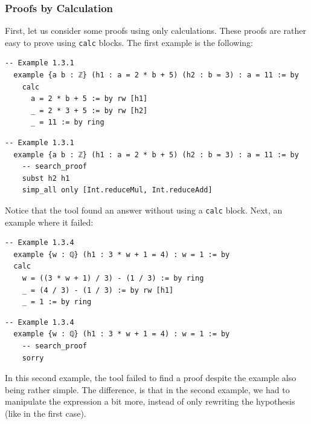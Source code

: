 \documentclass[12pt]{article}
\newcommand{\leancopilot}{\texttt{LeanCopilot} }
\begin{document}
\subsubsection{Proofs by Calculation}
First, let us consider some proofs using only calculations. These proofs are rather easy to prove using \texttt{calc} blocks. The first example is the following:

\begin{minipage}{0.495\textwidth}
  \begin{lstlisting}[title={Human proof}]
  -- Example 1.3.1
  example {a b : ℤ} (h1 : a = 2 * b + 5) (h2 : b = 3) : a = 11 := by
    calc
      a = 2 * b + 5 := by rw [h1]
      _ = 2 * 3 + 5 := by rw [h2]
      _ = 11 := by ring
  \end{lstlisting}
\end{minipage}
\vline
\begin{minipage}{0.495\textwidth}
  \begin{lstlisting}[title={\leancopilot proof}]
  -- Example 1.3.1
  example {a b : ℤ} (h1 : a = 2 * b + 5) (h2 : b = 3) : a = 11 := by
    -- search_proof
    subst h2 h1
    simp_all only [Int.reduceMul, Int.reduceAdd]
  \end{lstlisting}
\end{minipage}

Notice that the tool found an answer without using a \texttt{calc} block. Next, an example where it failed:

\begin{minipage}{0.495\textwidth}
  \begin{lstlisting}[title={Human proof}]
  -- Example 1.3.4
  example {w : ℚ} (h1 : 3 * w + 1 = 4) : w = 1 := by
  calc
    w = ((3 * w + 1) / 3) - (1 / 3) := by ring
    _ = (4 / 3) - (1 / 3) := by rw [h1]
    _ = 1 := by ring
  \end{lstlisting}
\end{minipage}
\vline
\begin{minipage}{0.495\textwidth}
  \begin{lstlisting}[title={\leancopilot proof}]
  -- Example 1.3.4
  example {w : ℚ} (h1 : 3 * w + 1 = 4) : w = 1 := by
    -- search_proof
    sorry
  \end{lstlisting}
\end{minipage}

In this second example, the tool failed to find a proof despite the example also being rather simple. The difference, is that in the second example, we had to manipulate the expression a bit more, instead of only rewriting the hypothesis (like in the first case). 
\end{document}
